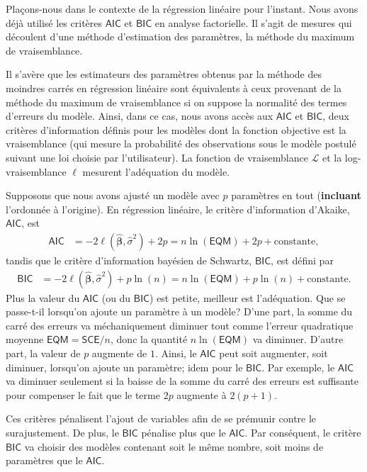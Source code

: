 \documentclass[
  11pt,
  letterpaper,
]{scrbook}
\theoremstyle{definition}
\theoremstyle{remark}
\begin{document}
Plaçons-nous dans le contexte de la régression linéaire pour l'instant.
Nous avons déjà utilisé les critères \(\mathsf{AIC}\) et
\(\mathsf{BIC}\) en analyse factorielle. Il s'agit de mesures qui
découlent d'une méthode d'estimation des paramètres, la méthode du
maximum de vraisemblance.

Il s'avère que les estimateurs des paramètres obtenus par la méthode des
moindres carrés en régression linéaire sont équivalents à ceux provenant
de la méthode du maximum de vraisemblance si on suppose la normalité des
termes d'erreurs du modèle. Ainsi, dans ce cas, nous avons accès aux
\(\mathsf{AIC}\) et \(\mathsf{BIC}\), deux critères d'information
définis pour les modèles dont la fonction objective est la vraisemblance
(qui mesure la probabilité des observations sous le modèle postulé
suivant une loi choisie par l'utilisateur). La fonction de vraisemblance
\(\mathcal{L}\) et la log-vraisemblance \(\ell\) mesurent l'adéquation
du modèle.

Supposons que nous avons ajusté un modèle avec \(p\) paramètres en tout
(\textbf{incluant} l'ordonnée à l'origine). En régression linéaire, le
critère d'information d'Akaike, \(\mathsf{AIC}\), est \begin{align*}
\mathsf{AIC} &=-2 \ell(\widehat{\boldsymbol{\beta}}, \widehat{\sigma}^2) +2p = n \ln (\mathsf{EQM}) + 2p + \text{constante},
\end{align*} tandis que le critère d'information bayésien de Schwartz,
\(\mathsf{BIC}\), est défini par \begin{align*}
\mathsf{BIC} &=-2 \ell(\widehat{\boldsymbol{\beta}}, \widehat{\sigma}^2) + p\ln(n)=n \ln (\mathsf{EQM}) + p\ln(n) + \text{constante}.
\end{align*} Plus la valeur du \(\mathsf{AIC}\) (ou du \(\mathsf{BIC}\))
est petite, meilleur est l'adéquation. Que se passe-t-il lorsqu'on
ajoute un paramètre à un modèle? D'une part, la somme du carré des
erreurs va méchaniquement diminuer tout comme l'erreur quadratique
moyenne \(\textsf{EQM} = \textsf{SCE}/n\), donc la quantité
\(n \ln (\mathsf{EQM})\) va diminuer. D'autre part, la valeur de \(p\)
augmente de \(1\). Ainsi, le \(\mathsf{AIC}\) peut soit augmenter, soit
diminuer, lorsqu'on ajoute un paramètre; idem pour le \(\mathsf{BIC}\).
Par exemple, le \(\mathsf{AIC}\) va diminuer seulement si la baisse de
la somme du carré des erreurs est suffisante pour compenser le fait que
le terme \(2p\) augmente à \(2 (p+1)\).

Ces critères pénalisent l'ajout de variables afin de se prémunir contre
le surajustement. De plus, le \(\mathsf{BIC}\) pénalise plus que le
\(\mathsf{AIC}\). Par conséquent, le critère \(\mathsf{BIC}\) va choisir
des modèles contenant soit le même nombre, soit moins de paramètres que
le \(\mathsf{AIC}\).
\end{document}

